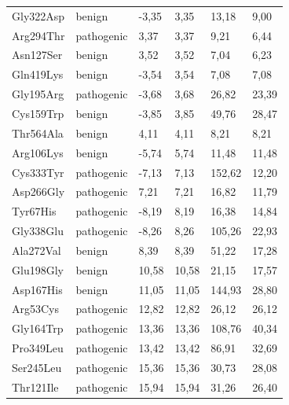 \begin{table}[]
{\begin{tabular}{llllll}
        Gly322Asp & benign & -3,35 & 3,35 & 13,18 & 9,00 \\
        \rowcolor[HTML]{FFCCC9} 
        Arg294Thr & pathogenic & 3,37 & 3,37 & 9,21 & 6,44 \\
        \rowcolor[HTML]{9AFF99} 
        Asn127Ser & benign & 3,52 & 3,52 & 7,04 & 6,23 \\
        \rowcolor[HTML]{9AFF99} 
        Gln419Lys & benign & -3,54 & 3,54 & 7,08 & 7,08 \\
        \rowcolor[HTML]{FFCCC9} 
        Gly195Arg & pathogenic & -3,68 & 3,68 & 26,82 & 23,39 \\
        \rowcolor[HTML]{9AFF99} 
        Cys159Trp & benign & -3,85 & 3,85 & 49,76 & 28,47 \\
        \rowcolor[HTML]{9AFF99} 
        Thr564Ala & benign & 4,11 & 4,11 & 8,21 & 8,21 \\
        \rowcolor[HTML]{9AFF99} 
        Arg106Lys & benign & -5,74 & 5,74 & 11,48 & 11,48 \\
        \rowcolor[HTML]{FFCCC9} 
        Cys333Tyr & pathogenic & -7,13 & 7,13 & 152,62 & 12,20 \\
        \rowcolor[HTML]{FFCCC9} 
        Asp266Gly & pathogenic & 7,21 & 7,21 & 16,82 & 11,79 \\
        \rowcolor[HTML]{FFCCC9} 
        Tyr67His & pathogenic & -8,19 & 8,19 & 16,38 & 14,84 \\
        \rowcolor[HTML]{FFCCC9} 
        Gly338Glu & pathogenic & -8,26 & 8,26 & 105,26 & 22,93 \\
        \rowcolor[HTML]{EFEFEF} 
        Ala272Val & benign & 8,39 & 8,39 & 51,22 & 17,28 \\
        \rowcolor[HTML]{CBFFCB} 
        Glu198Gly & benign & 10,58 & 10,58 & 21,15 & 17,57 \\
        \rowcolor[HTML]{EFEFEF} 
        Asp167His & benign & 11,05 & 11,05 & 144,93 & 28,80 \\
        \rowcolor[HTML]{FFCCC9} 
        Arg53Cys & pathogenic & 12,82 & 12,82 & 26,12 & 26,12 \\
        \rowcolor[HTML]{FFCCC9} 
        Gly164Trp & pathogenic & 13,36 & 13,36 & 108,76 & 40,34 \\
        \rowcolor[HTML]{FFCCC9} 
        Pro349Leu & pathogenic & 13,42 & 13,42 & 86,91 & 32,69 \\
        \rowcolor[HTML]{FFCCC9} 
        Ser245Leu & pathogenic & 15,36 & 15,36 & 30,73 & 28,08 \\
        \rowcolor[HTML]{FFCCC9} 
        Thr121Ile & pathogenic & 15,94 & 15,94 & 31,26 & 26,40 \\

\end{tabular}}
\end{table}
